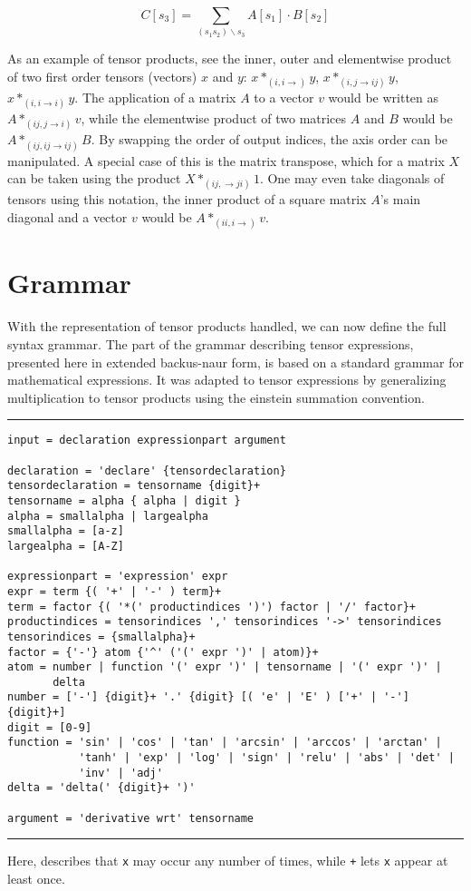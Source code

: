 \documentclass[12pt, a4paper]{report}
\begin{document}
\begin{equation}
    C[s_3] = \sum_{(s_1 s_2)  \backslash s_3} A[s_1] \cdot B[s_2]
    \label{eq:product}
\end{equation}

As an example of tensor products, see the inner, outer and elementwise product of two first order tensors (vectors) $x$ and $y$: $x*_{(i,i \rightarrow)}y$, $x*_{(i,j \rightarrow ij)}y$, $x*_{(i,i \rightarrow i)}y$.
The application of a matrix $A$ to a vector $v$ would be written as $A*_{(ij,j \rightarrow i)}v$, while the elementwise product of two matrices $A$ and $B$ would be $A*_{(ij,ij \rightarrow ij)}B$.
By swapping the order of output indices, the axis order can be manipulated.
A special case of this is the matrix transpose, which for a matrix $X$ can be taken using the product $X *_{(ij, \rightarrow ji)} 1$.
One may even take diagonals of tensors using this notation, the inner product of a square matrix $A$'s main diagonal and a vector $v$ would be $A*_{(ii,i \rightarrow)}v$.


\section{Grammar}
With the representation of tensor products handled, we can now define the full syntax grammar.
The part of the grammar describing tensor expressions, presented here in extended backus-naur form, is based on a standard grammar for mathematical expressions.
It was adapted to tensor expressions by generalizing multiplication to tensor products using the einstein summation convention.

\rule[-2pt]{\textwidth}{0.5pt}
{
\small
\begin{verbatim}
input = declaration expressionpart argument

declaration = 'declare' {tensordeclaration}
tensordeclaration = tensorname {digit}+
tensorname = alpha { alpha | digit }
alpha = smallalpha | largealpha
smallalpha = [a-z]
largealpha = [A-Z]

expressionpart = 'expression' expr
expr = term {( '+' | '-' ) term}+
term = factor {( '*(' productindices ')') factor | '/' factor}+
productindices = tensorindices ',' tensorindices '->' tensorindices
tensorindices = {smallalpha}+
factor = {'-'} atom {'^' ('(' expr ')' | atom)}+
atom = number | function '(' expr ')' | tensorname | '(' expr ')' | 
       delta
number = ['-'] {digit}+ '.' {digit} [( 'e' | 'E' ) ['+' | '-'] {digit}+]
digit = [0-9]
function = 'sin' | 'cos' | 'tan' | 'arcsin' | 'arccos' | 'arctan' | 
           'tanh' | 'exp' | 'log' | 'sign' | 'relu' | 'abs' | 'det' | 
           'inv' | 'adj'
delta = 'delta(' {digit}+ ')' 

argument = 'derivative wrt' tensorname
\end{verbatim}
}
\rule[8pt]{\textwidth}{0.1pt}
Here, \texttt{} describes that \texttt{x} may occur any number of times, while \texttt{+} lets \texttt{x} appear at least once.
\end{document}

